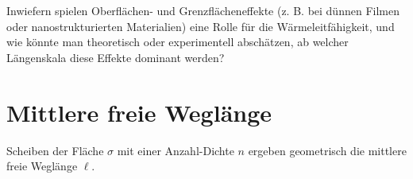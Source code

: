 \begin{questions}
\item Inwiefern spielen Oberflächen- und Grenzflächeneffekte (z. B. bei dünnen Filmen oder nanostrukturierten Materialien) eine Rolle für die Wärmeleitfähigkeit, und wie könnte man theoretisch oder experimentell abschätzen, ab welcher Längenskala diese Effekte dominant werden?
\end{questions}





\section*{Mittlere freie Weglänge}

\begin{marginfigure}
    \caption{Scheiben der Fläche $\sigma$ mit einer Anzahl-Dichte $n$ ergeben geometrisch die mittlere freie Weglänge $\ell$.}
     \label{fig:1_crosssection}
\end{marginfigure}

